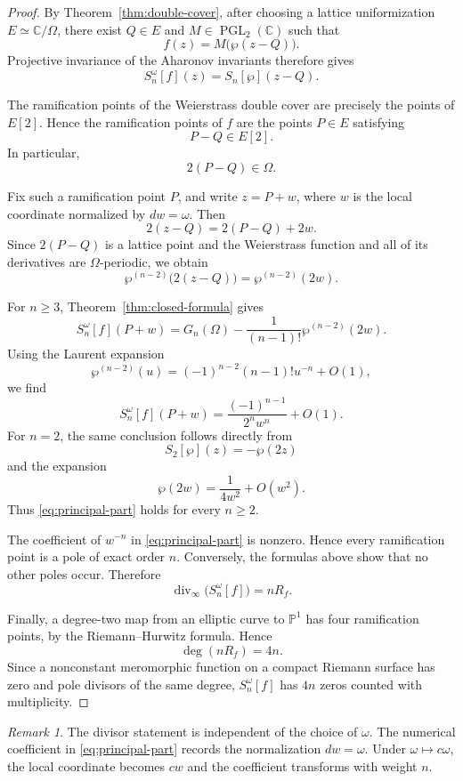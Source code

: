 \documentclass[11pt]{amsart}
\theoremstyle{definition}
\theoremstyle{remark}
\newtheorem{remark}[thm]{Remark}
\numberwithin{equation}{section}
\begin{document}
\begin{proof}
By Theorem~\ref{thm:double-cover}, after choosing a lattice
uniformization \(E\simeq\mathbb C/\Omega\), there exist \(Q\in E\) and
\(M\in\operatorname{PGL}_2(\mathbb C)\) such that
\[
f(z)=M\bigl(\wp(z-Q)\bigr).
\]
Projective invariance of the Aharonov invariants therefore gives
\[
S_n^\omega[f](z)=S_n[\wp](z-Q).
\]

The ramification points of the Weierstrass double cover are precisely
the points of \(E[2]\). Hence the ramification points of \(f\) are the
points \(P\in E\) satisfying
\[
P-Q\in E[2].
\]
In particular,
\[
2(P-Q)\in\Omega.
\]

Fix such a ramification point \(P\), and write \(z=P+w\), where \(w\)
is the local coordinate normalized by \(dw=\omega\). Then
\[
2(z-Q)=2(P-Q)+2w.
\]
Since \(2(P-Q)\) is a lattice point and the Weierstrass function and
all of its derivatives are \(\Omega\)-periodic, we obtain
\[
\wp^{(n-2)}\bigl(2(z-Q)\bigr)
=
\wp^{(n-2)}(2w).
\]

For \(n\geq3\), Theorem~\ref{thm:closed-formula} gives
\[
S_n^\omega[f](P+w)
=
G_n(\Omega)
-
\frac{1}{(n-1)!}\wp^{(n-2)}(2w).
\]
Using the Laurent expansion
\[
\wp^{(n-2)}(u)
=
(-1)^{n-2}(n-1)!u^{-n}
+
O(1),
\]
we find
\[
S_n^\omega[f](P+w)
=
\frac{(-1)^{n-1}}{2^n w^n}
+
O(1).
\]
For \(n=2\), the same conclusion follows directly from
\[
S_2[\wp](z)=-\wp(2z)
\]
and the expansion
\[
\wp(2w)=\frac{1}{4w^2}+O(w^2).
\]
Thus \eqref{eq:principal-part} holds for every \(n\geq2\).

The coefficient of \(w^{-n}\) in \eqref{eq:principal-part} is nonzero.
Hence every ramification point is a pole of exact order \(n\).
Conversely, the formulas above show that no other poles occur. Therefore
\[
\operatorname{div}_{\infty}\bigl(S_n^\omega[f]\bigr)=nR_f.
\]

Finally, a degree-two map from an elliptic curve to \(\mathbb P^1\)
has four ramification points, by the Riemann--Hurwitz formula. Hence
\[
\deg(nR_f)=4n.
\]
Since a nonconstant meromorphic function on a compact Riemann surface
has zero and pole divisors of the same degree, \(S_n^\omega[f]\) has
\(4n\) zeros counted with multiplicity.
\end{proof}


\begin{remark}
The divisor statement is independent of the choice of $\omega$. The numerical
coefficient in \eqref{eq:principal-part} records the normalization $dw=\omega$.
Under $\omega\mapsto c\omega$, the local coordinate becomes $cw$ and the
coefficient transforms with weight $n$.
\end{remark}
\end{document}
